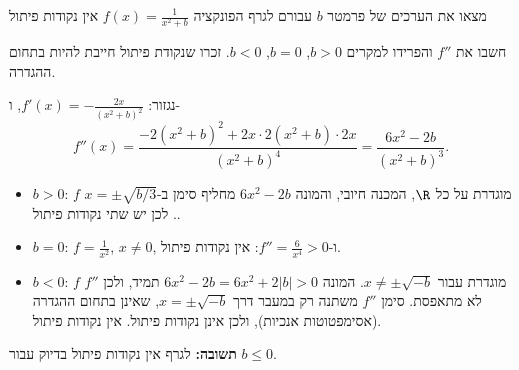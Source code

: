 
\begin{question}
מצאו את הערכים של פרמטר $b$ עבורם לגרף הפונקציה $\displaystyle f(x)=\frac{1}{x^2+b}$ אין נקודות פיתול
\end{question}

\begin{hint}
חשבו את $f''$ והפרידו למקרים $b>0$, $b=0$, $b<0$. זכרו שנקודת פיתול חייבת להיות בתחום ההגדרה.
\end{hint}

\begin{solution}
נגזור: $f'(x)=-\frac{2x}{(x^2+b)^2}$, ו-
\[ f''(x)=\frac{-2(x^2+b)^2+2x\cdot2(x^2+b)\cdot2x}{(x^2+b)^4}=\frac{6x^2-2b}{(x^2+b)^3}. \]
\begin{itemize}
  \item $b>0$: $f$ מוגדרת על כל $\R$, המכנה חיובי, והמונה $6x^2-2b$ מחליף סימן ב-$x=\pm\sqrt{b/3}$. לכן יש שתי נקודות פיתול.
  \item $b=0$: $f=\frac1{x^2}$, $x\neq0$, ו-$f''=\frac{6}{x^4}>0$: אין נקודות פיתול.
  \item $b<0$: $f$ מוגדרת עבור $x\neq\pm\sqrt{-b}$. המונה $6x^2-2b=6x^2+2|b|>0$ תמיד, ולכן $f''$ לא מתאפסת. סימן $f''$ משתנה רק במעבר דרך $x=\pm\sqrt{-b}$, שאינן בתחום ההגדרה (אסימפטוטות אנכיות), ולכן אינן נקודות פיתול. אין נקודות פיתול.
\end{itemize}
\textbf{תשובה:} לגרף אין נקודות פיתול בדיוק עבור $\boxed{b\le 0}$.
\end{solution}
